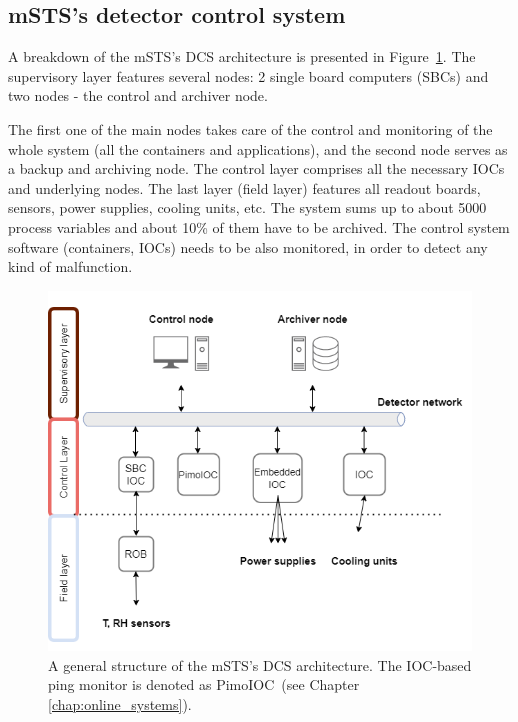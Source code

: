 \subsection{mSTS's detector control system}
A breakdown of the \gls{mSTS}'s \gls{DCS} architecture is presented in Figure~\ref{fig_mstsarch}. The supervisory layer features several nodes: 2 single board computers (\glspl{SBC}) and two nodes - the control and archiver node. 

The first one of the main nodes takes care of the control and monitoring of the whole system (all the containers and applications), and the second node serves as a backup and archiving node. The control layer comprises all the necessary \glspl{IOC} and underlying nodes. The last layer (field layer) features all readout boards, sensors, power supplies, cooling units, etc. The system sums up to about 5000 process variables and about 10\% of them have to be archived. The control system software (containers, \glspl{IOC}) needs to be also monitored, in order to detect any kind of malfunction. 

\begin{figure}[!h]
\centering
\includegraphics[width=0.65\columnwidth]{Chapter6/DCS/images/mcbmpng (2).png}
\caption{A general structure of the \gls{mSTS}'s \gls{DCS} architecture. The IOC-based ping monitor is denoted as PimoIOC~(see Chapter \ref{chap:online_systems}).}
\label{fig_mstsarch}
\end{figure}

